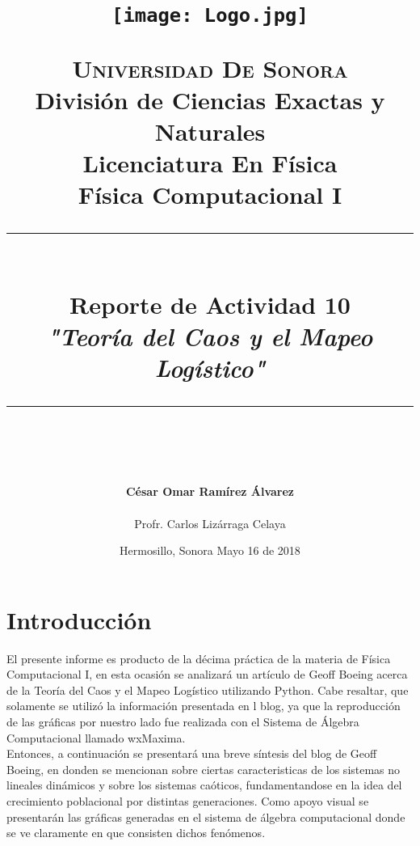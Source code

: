 \documentclass[12pt]{article}
\newcommand{\HRule}[1]{\rule{\linewidth}{#1}}
\begin{document}
\begin{titlepage}

\title{ \normalsize 
        \begin{center}
        \texttt{[image: Logo.jpg]}
        \end{center}
        \LARGE \textsc{\textbf{Universidad De Sonora}} \\ \bigskip
		\Large División de Ciencias Exactas y Naturales \\
        Licenciatura En Física \\ \bigskip
        \bigskip
        Física Computacional I
		\\ [0.1cm]  
		\HRule{2pt} \\
		\Large \textbf{{Reporte de Actividad 10}} \\
        \textit{\textbf{"Teoría del Caos y el Mapeo Logístico"}}
		\HRule{2pt} \\
		\normalsize \vspace*{0.001\baselineskip}}
        
\date{\bigskip \Large Hermosillo, Sonora  \hspace*{\fill}  Mayo 16 de 2018}

        
\author{
		\Large\textbf{ César Omar Ramírez Álvarez} \\ \bigskip
        \\ \bigskip
       \Large Profr. Carlos Lizárraga Celaya}
       \end{titlepage}
       \maketitle
       

\newpage
\pagestyle{plain}
\section*{Introducción}
El presente informe es producto de la décima práctica de la materia de Física Computacional I, en esta ocasión se analizará un artículo de Geoff Boeing acerca de la Teoría del Caos y el Mapeo Logístico utilizando Python. Cabe resaltar, que solamente se utilizó la información presentada en l blog, ya que la reproducción de las gráficas por nuestro lado fue realizada con el Sistema de Álgebra Computacional llamado wxMaxima.\\

Entonces, a continuación se presentará una breve síntesis del blog de Geoff Boeing, en donden se mencionan sobre ciertas caracteristicas de los sistemas no lineales dinámicos y sobre los sistemas caóticos, fundamentandose en la idea del crecimiento poblacional por distintas generaciones. Como apoyo visual se presentarán las gráficas generadas en el sistema de álgebra computacional donde se ve claramente en que consisten dichos fenómenos.
\end{document}
